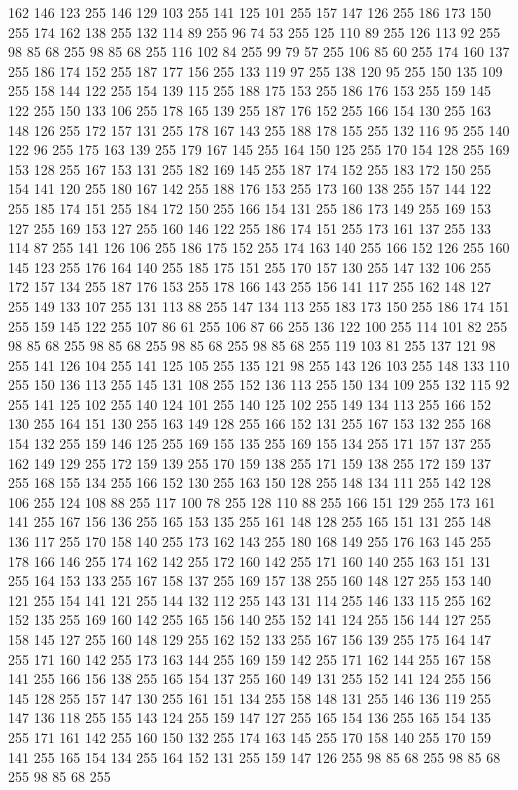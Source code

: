 162 146 123 255 146 129 103 255 141 125 101 255 157 147 126 255 186 173 150 255 174 162 138 255 132 114 89 255 96 74 53 255 125 110 89 255 126 113 92 255 98 85 68 255 98 85 68 255 116 102 84 255 99 79 57 255 106 85 60 255 174 160 137 255 186 174 152 255 187 177 156 255 133 119 97 255 138 120 95 255 150 135 109 255 158 144 122 255 154 139 115 255 188 175 153 255 186 176 153 255 159 145 122 255 150 133 106 255 178 165 139 255 187 176 152 255 166 154 130 255 163 148 126 255 172 157 131 255 178 167 143 255 188 178 155 255 132 116 95 255 140 122 96 255 175 163 139 255 179 167 145 255 164 150 125 255 170 154 128 255 169 153 128 255 167 153 131 255 182 169 145 255 187 174 152 255 183 172 150 255 154 141 120 255 180 167 142 255 188 176 153 255 173 160 138 255 157 144 122 255 185 174 151 255 184 172 150 255 166 154 131 255 186 173 149 255 169 153 127 255 169 153 127 255 160 146 122 255 186 174 151 255 173 161 137 255 133 114 87 255 141 126 106 255 186 175 152 255 174 163 140 255 166 152 126 255
160 145 123 255 176 164 140 255 185 175 151 255 170 157 130 255 147 132 106 255 172 157 134 255 187 176 153 255 178 166 143 255 156 141 117 255 162 148 127 255 149 133 107 255 131 113 88 255 147 134 113 255 183 173 150 255 186 174 151 255 159 145 122 255 107 86 61 255 106 87 66 255 136 122 100 255 114 101 82 255 98 85 68 255 98 85 68 255 98 85 68 255 98 85 68 255 119 103 81 255 137 121 98 255 141 126 104 255 141 125 105 255 135 121 98 255 143 126 103 255 148 133 110 255 150 136 113 255 145 131 108 255 152 136 113 255 150 134 109 255 132 115 92 255 141 125 102 255 140 124 101 255 140 125 102 255 149 134 113 255 166 152 130 255 164 151 130 255 163 149 128 255 166 152 131 255 167 153 132 255 168 154 132 255 159 146 125 255 169 155 135 255 169 155 134 255 171 157 137 255 162 149 129 255 172 159 139 255 170 159 138 255 171 159 138 255 172 159 137 255 168 155 134 255 166 152 130 255 163 150 128 255 148 134 111 255 142 128 106 255 124 108 88 255 117 100 78 255 128 110 88 255 166 151 129 255
173 161 141 255 167 156 136 255 165 153 135 255 161 148 128 255 165 151 131 255 148 136 117 255 170 158 140 255 173 162 143 255 180 168 149 255 176 163 145 255 178 166 146 255 174 162 142 255 172 160 142 255 171 160 140 255 163 151 131 255 164 153 133 255 167 158 137 255 169 157 138 255 160 148 127 255 153 140 121 255 154 141 121 255 144 132 112 255 143 131 114 255 146 133 115 255 162 152 135 255 169 160 142 255 165 156 140 255 152 141 124 255 156 144 127 255 158 145 127 255 160 148 129 255 162 152 133 255 167 156 139 255 175 164 147 255 171 160 142 255 173 163 144 255 169 159 142 255 171 162 144 255 167 158 141 255 166 156 138 255 165 154 137 255 160 149 131 255 152 141 124 255 156 145 128 255 157 147 130 255 161 151 134 255 158 148 131 255 146 136 119 255 147 136 118 255 155 143 124 255 159 147 127 255 165 154 136 255 165 154 135 255 171 161 142 255 160 150 132 255 174 163 145 255 170 158 140 255 170 159 141 255 165 154 134 255 164 152 131 255 159 147 126 255 98 85 68 255 98 85 68 255 98 85 68 255
